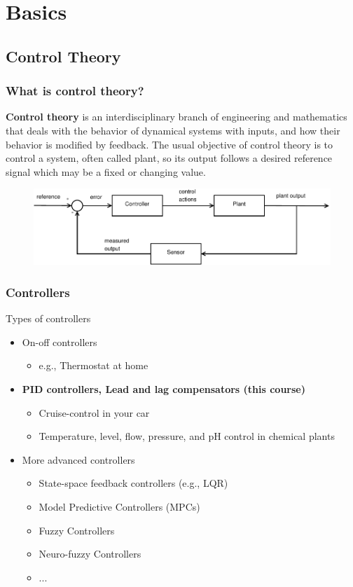 \section{Basics}

\subsection[Control Theory]{Control Theory}
\begin{frame}
\frametitle{What is control theory?}
\begin{block}{}
	\textbf{Control theory} is an interdisciplinary branch of engineering and mathematics that deals with the behavior of dynamical systems with inputs, and how their behavior is modified by feedback. The usual objective of control theory is to control a system, often called plant, so its output follows a desired reference signal which may be a fixed or changing value.
\end{block}
\begin{figure}
	\centering
	\includegraphics[width=1\linewidth]{controlsystem}
	\label{fig:controlsystem}
\end{figure}
\end{frame}

\begin{frame}
	\frametitle{Controllers}
	\begin{block}{Types of controllers}
		\begin{itemize}
			\item On-off controllers
			\begin{itemize}
				\item e.g., Thermostat at home
			\end{itemize}
			\item \textbf{PID controllers, Lead and lag compensators (this course)}
			\begin{itemize}
				\item Cruise-control in your car
				\item Temperature, level, flow, pressure,  and pH control in chemical plants
			\end{itemize}
			\item More advanced controllers
			\begin{itemize}
				\item State-space feedback controllers (e.g., LQR)
				\item Model Predictive Controllers (MPCs)
				\item Fuzzy Controllers
				\item Neuro-fuzzy Controllers
				\item ...
			\end{itemize}
		\end{itemize}
	\end{block}
\end{frame}



